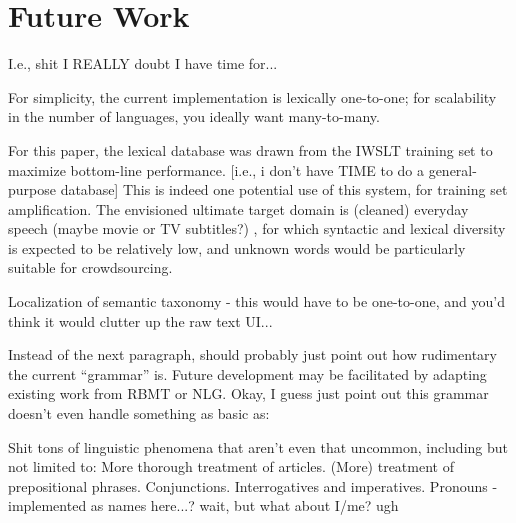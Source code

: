 \section{Future Work}

I.e., shit I REALLY doubt I have time for...

For simplicity, the current implementation is lexically one-to-one; for scalability in the number of languages, you ideally want many-to-many.

For this paper, the lexical database was drawn from the IWSLT training set to maximize bottom-line performance.
[i.e., i don't have TIME to do a general-purpose database]
This is indeed one potential use of this system, for training set amplification.
The envisioned ultimate target domain is (cleaned) everyday speech (maybe movie or TV subtitles?) , for which syntactic and lexical diversity is expected to be relatively low, and unknown words would be particularly suitable for crowdsourcing.

Localization of semantic taxonomy - this would have to be one-to-one, and you'd think it would clutter up the raw text UI...


Instead of the next paragraph, should probably just point out how rudimentary the current ``grammar'' is. 
Future development may be facilitated by adapting existing work from RBMT or NLG. 
Okay, I guess just point out this grammar doesn't even handle something as basic as:

Shit tons of linguistic phenomena that aren't even that uncommon, including but not limited to:
More thorough treatment of articles.
(More) treatment of prepositional phrases.
Conjunctions.
Interrogatives and imperatives.
Pronouns - implemented as names here...? wait, but what about I/me? ugh






